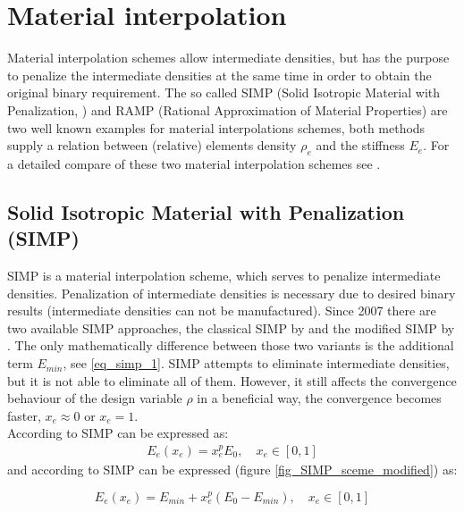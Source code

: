 \section{Material interpolation}
Material interpolation schemes allow intermediate densities, but has the purpose to penalize the intermediate densities
 at the same time in order to obtain the original binary requirement. The so called SIMP (Solid Isotropic Material with Penalization, \cite{Bendse.1988}) and RAMP (Rational Approximation of Material Properties) are two well known examples for material interpolations schemes, both methods supply a relation between (relative) elements density \textbf{$\rho_e$} and the stiffness
 $E_e$.
  For a detailed compare of these two material interpolation schemes see \cite{Hvejsel.2011}.\\

\subsection{Solid Isotropic Material with Penalization (SIMP)}
\label{subsection_SIMP}
SIMP is a material interpolation scheme, which serves to penalize intermediate densities. Penalization of intermediate densities is necessary due to desired binary results (intermediate densities can not be manufactured). Since 2007 there are two available SIMP approaches, the classical SIMP by \cite{Bendse.1988} and the modified SIMP by \cite{Sigmund.2007}. The only mathematically difference between those two variants is the additional term $E_{min}$, see \eqref{eq_simp_1}.
 SIMP attempts to eliminate intermediate densities, but it is not able to eliminate all of them. However, it still affects the convergence behaviour of the design variable $\rho$ in a beneficial way, the convergence becomes faster,
 $x_e \approx 0 $ or $x_e = 1$.\\
 
According to \cite{Bendse.1988} SIMP can be expressed as: 
\begin{align}
E_e(x_e) = x_{e}^p E_{0}, \quad x_e \in [0,1]
\end{align}
and according to \cite{Sigmund.2007} SIMP can be expressed (figure \ref{fig_SIMP_sceme_modified}) as:

\begin{equation}
\label{eq_simp_1}
 E_e(x_e) = E_{min}+ x_e^p (E_0-E_{min}), \quad x_e \in [0,1]
 \end{equation}\\
 
